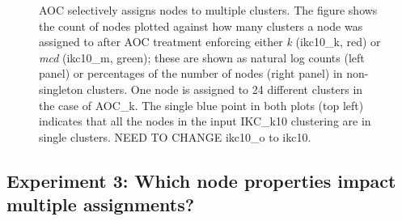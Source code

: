 \documentclass[12pt, oneside]{article}   	%
\begin{document}
\begin{figure}[H]
\begin{subfigure}[t]{0.48\textwidth}
		\end{subfigure}
		\captionsetup{width=0.9\textwidth}	
		\caption{AOC selectively assigns nodes to multiple clusters. The figure shows the count of nodes plotted against how many clusters a node was assigned to after AOC treatment enforcing either \emph{k} (ikc10\_k, red) or \emph{mcd} (ikc10\_m, green);  these are shown as natural log counts (left panel) or percentages of the number of nodes (right panel) in non-singleton clusters. One node is assigned to 24 different clusters in the case of AOC\_k. The single blue point in both plots (top left) indicates that all the nodes in the input IKC\_k10 clustering are in single clusters. NEED TO CHANGE ikc10\_o to ikc10.}
		\label{fig:fig2}
	\end{figure}
	
	\subsection{Experiment 3: Which node properties impact multiple assignments?}
	
\end{document}
